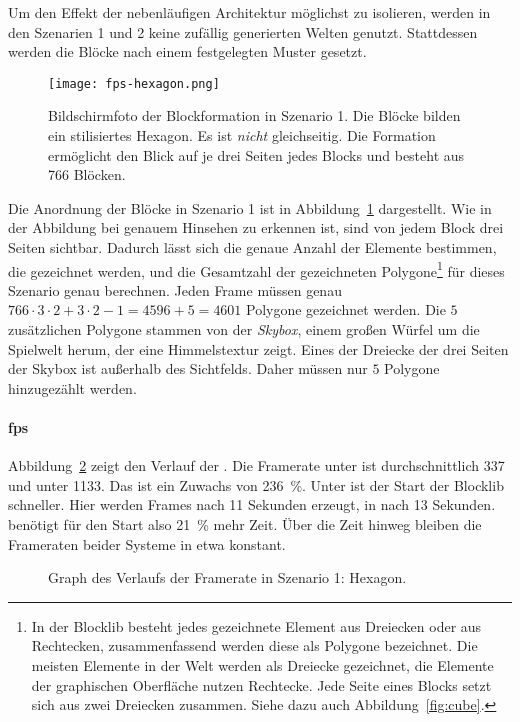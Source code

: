 
Um den Effekt der nebenläufigen Architektur möglichst zu isolieren, werden in den Szenarien 1 und 2 keine zufällig generierten Welten genutzt. Stattdessen werden die Blöcke nach einem festgelegten Muster gesetzt.

\begin{figure}
	\centering
	\texttt{[image: fps-hexagon.png]}
	\caption[Bildschirmfoto der Blockformation in Szenario 1 der Performanceanalyse.]{Bildschirmfoto der Blockformation in Szenario 1. Die Blöcke bilden ein stilisiertes Hexagon. Es ist \emph{nicht} gleichseitig. Die Formation ermöglicht den Blick auf je drei Seiten jedes Blocks und besteht aus 766 Blöcken.}\label{fig:hexagon}
\end{figure}
Die Anordnung der Blöcke in Szenario 1 ist in Abbildung~\ref{fig:hexagon} dargestellt. Wie in der Abbildung bei genauem Hinsehen zu erkennen ist, sind von jedem Block drei Seiten sichtbar. Dadurch lässt sich die genaue Anzahl der Elemente bestimmen, die gezeichnet werden, und die Gesamtzahl der gezeichneten Polygone\footnote{In der Blocklib besteht jedes gezeichnete Element aus Dreiecken oder aus Rechtecken, zusammenfassend werden diese als Polygone bezeichnet. Die meisten Elemente in der Welt werden als Dreiecke gezeichnet, die Elemente der graphischen Oberfläche nutzen Rechtecke. Jede Seite eines Blocks setzt sich aus zwei Dreiecken zusammen. Siehe dazu auch Abbildung~\vref{fig:cube}.} für dieses Szenario genau berechnen. Jeden Frame müssen genau $766\cdot3\cdot2 + 3\cdot2-1 = 4596 +5 = 4601$ Polygone gezeichnet werden. Die $5$ zusätzlichen Polygone stammen von der \emph{Skybox}, einem großen Würfel um die Spielwelt herum, der eine Himmelstextur zeigt. Eines der Dreiecke der drei Seiten der Skybox ist außerhalb des Sichtfelds. Daher müssen nur $5$ Polygone hinzugezählt werden.


\paragraph{\ac{fps}} Abbildung~\ref{fig:seed-0-hexagon-fps} zeigt den Verlauf der \si{\fps}. Die Framerate unter \sysA{} ist durchschnittlich \SI{337}{\fps} und unter \sysB{} \SI{1133}{\fps}. Das ist ein Zuwachs von \SI{236}{\percent}. Unter \sysA{} ist der Start der Blocklib schneller. Hier werden Frames nach 11 Sekunden erzeugt, in \sysB{} nach 13 Sekunden. \sysB{} benötigt für den Start also \SI{21}{\percent} mehr Zeit. Über die Zeit hinweg bleiben die Frameraten beider Systeme in etwa konstant.
\begin{figure}[!htbp]
	\settowidth{}
	\caption{Graph des Verlaufs der Framerate in Szenario 1: Hexagon.}\label{fig:seed-0-hexagon-fps}
\end{figure}


